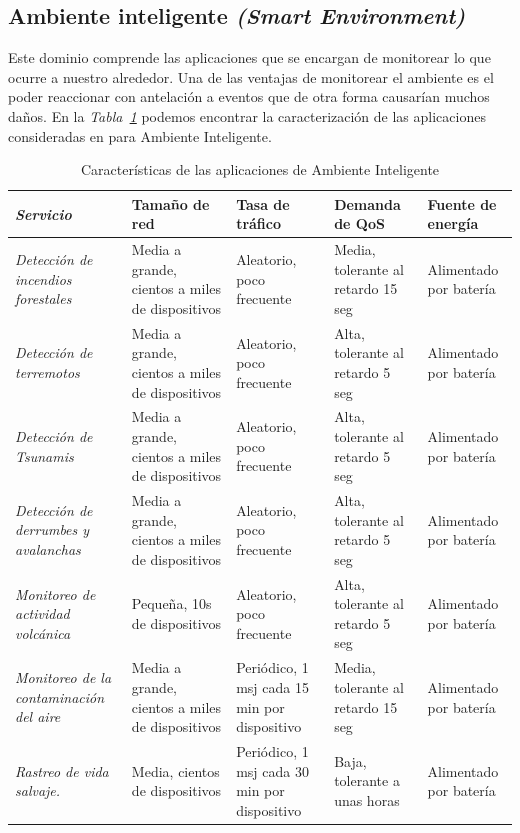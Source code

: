 \subsection{Ambiente inteligente \textit{(Smart Environment)}}

Este dominio comprende las aplicaciones que se encargan de monitorear lo que ocurre a nuestro alrededor. Una de las ventajas de monitorear el ambiente es el poder reaccionar con antelación a eventos que de otra forma causarían muchos daños. En la \textit{Tabla~\ref{tab:smartenv}} podemos encontrar la caracterización de las aplicaciones consideradas en \parencite{NetTrafficIoT} para Ambiente Inteligente.

\begin{table}
\caption{Características de las aplicaciones de Ambiente Inteligente}
\label{tab:smartenv}
\centering
\begin{tabular}{*{5}{m{3cm}}} \\ 
\textbf{\textit{Servicio}} & \textbf{Tamaño de red} & \textbf{Tasa de tráfico} & \textbf{Demanda de QoS} & \textbf{Fuente de energía} \\ \hline \hline
\textit{Detección de incendios forestales}  & \footnotesize{ Media a grande, cientos a miles de dispositivos } & \footnotesize{ Aleatorio, poco frecuente } & \footnotesize{ Media, tolerante al retardo 15 seg } & \footnotesize{ Alimentado por batería } \\ \hline 
\textit{Detección de terremotos}  & \footnotesize{ Media a grande, cientos a miles de dispositivos } & \footnotesize{ Aleatorio, poco frecuente } & \footnotesize{ Alta, tolerante al retardo 5 seg } & \footnotesize{ Alimentado por batería } \\ \hline 
\textit{Detección de Tsunamis}  & \footnotesize{ Media a grande, cientos a miles de dispositivos } & \footnotesize{ Aleatorio, poco frecuente } & \footnotesize{ Alta, tolerante al retardo 5 seg } & \footnotesize{ Alimentado por batería } \\ \hline 
\textit{Detección de derrumbes y avalanchas}  & \footnotesize{ Media a grande, cientos a miles de dispositivos } & \footnotesize{ Aleatorio, poco frecuente } & \footnotesize{ Alta, tolerante al retardo 5 seg } & \footnotesize{ Alimentado por batería } \\ \hline 
\textit{Monitoreo de actividad volcánica}  & \footnotesize{ Pequeña, 10s de dispositivos } & \footnotesize{ Aleatorio, poco frecuente } & \footnotesize{ Alta, tolerante al retardo 5 seg } & \footnotesize{ Alimentado por batería } \\ \hline 
\textit{Monitoreo de la contaminación del aire } & \footnotesize{ Media a grande, cientos a miles de dispositivos } & \footnotesize{ Periódico, 1 msj cada 15 min por dispositivo } & \footnotesize{ Media, tolerante al retardo 15 seg } & \footnotesize{ Alimentado por batería } \\ \hline 
\textit{Rastreo de vida salvaje.}  & \footnotesize{ Media, cientos de dispositivos } & \footnotesize{ Periódico, 1 msj cada 30 min por dispositivo } & \footnotesize{ Baja, tolerante a unas horas } & \footnotesize{ Alimentado por batería } \\ 
\end{tabular}
\end{table}

